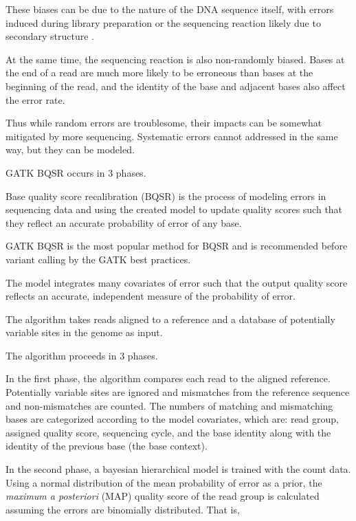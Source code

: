 \documentclass{article}
\begin{document}
\begin{outline}
\begin{outline}
		\item These biases can be due to the nature of the DNA sequence itself, with errors induced during library preparation or the sequencing reaction likely due to secondary structure \parencite{meacham_identification_2011, nakamura_sequence-specific_2011}.
		\item At the same time, the sequencing reaction is also non-randomly biased. Bases at the end of a read are much more likely to be erroneous than bases at the beginning of the read, and the identity of the base and adjacent bases also affect the error rate. %
		\item Thus while random errors are troublesome, their impacts can be somewhat mitigated by more sequencing. Systematic errors cannot addressed in the same way, but they can be modeled.
	\end{outline}
	\item GATK BQSR occurs in 3 phases.
	\begin{outline}
		\item Base quality score recalibration (BQSR) is the process of modeling errors in sequencing data and using the created model to update quality scores such that they reflect an accurate probability of error of any base.
		\item GATK BQSR  is the most popular method for BQSR and is recommended before variant calling by the GATK best practices. %
		\item The model integrates many covariates of error such that the output quality score reflects an accurate, independent measure of the probability of error.
		\item The algorithm takes reads aligned to a reference and a database of potentially variable sites in the genome as input.
		\item The algorithm proceeds in 3 phases.
		\item In the first phase, the algorithm compares each read to the aligned reference. Potentially variable sites are ignored and mismatches from the reference sequence and non-mismatches are counted. The numbers of matching and mismatching bases are categorized according to the model covariates, which are: read group, assigned quality score, sequencing cycle, and the base identity along with the identity of the previous base (the base context).
		\item In the second phase, a bayesian hierarchical model is trained with the count data. Using a normal distribution of the mean probability of error as a prior, the \textit{maximum a posteriori} (MAP) quality score of the read group is calculated assuming the errors are binomially distributed. That is,

\end{outline}
\end{outline}
\end{document}
